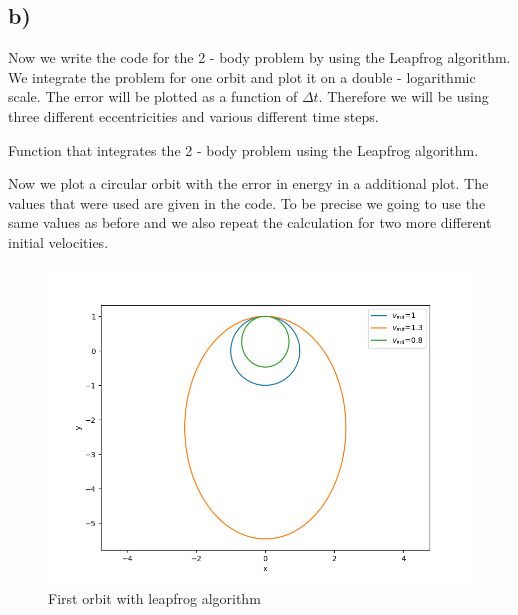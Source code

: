 \documentclass[11pt, a4paper, reqno]{scrartcl}
\begin{document}
    	\subsection*{b)}
			Now we write the code for the 2 - body problem by using the 
			Leapfrog algorithm. We integrate the problem for one orbit and 
			plot it on a double - logarithmic scale. The error will be plotted 
			as a function of $\Delta t$. Therefore we will be using three 
			different eccentricities and various different time steps.
			\newline
			
			Function that integrates the 2 - body problem using the Leapfrog 
			algorithm.
			
    		\begin{figure}[H]
        		        
    		\end{figure}
    		
    		
    		Now we plot a circular orbit with the error in energy in a 
    		additional plot. The values that were used are given in the code. To be precise we going to use the same values as before and we also repeat the calculation for two more different initial velocities.
    		
    		\begin{figure}[H]
        		   
    		\end{figure}
    		
    		\begin{figure}[H]
    			\centering
    			\includegraphics[height=.33\paperheight]{fig_b1.png}
    			\caption{First orbit with leapfrog algorithm}
    		\end{figure}
    		
\end{document}
